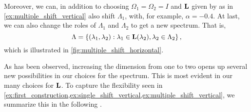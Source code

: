 \documentclass[../thesis.tex]{subfiles}
\begin{document}
\begin{remark}\label{rem:switch_lambda}
    Moreover, we can, in addition to choosing $\Omega_1=\Omega_2 = I$ and $\mathbf{L}$ given by  as in \cref{ex:multiple_shift_vertical} also shift $\Lambda_1$, with, for example, $\alpha = -0.4$. %
    At last, we can also change the roles of $\Lambda_1$ and $\Lambda_2$ to get a new spectrum. That is,
    \begin{equation*}
        \Lambda = \left\{\left(\lambda_1, \lambda_2\right): \lambda_1 \in \mathbf{L}(\lambda_2), \lambda_2 \in \Lambda_2 \right\},
    \end{equation*}
    which is illustrated in \cref{fig:multiple_shift_horizontal}.
\end{remark}

As has been observed, increasing the dimension from one to two opens up several new possibilities in our choices for the spectrum. This is most evident in our many choices for $\mathbf{L}$. To capture the flexibility seen in \cref{ex:first_construction,ex:single_shift_vertical,ex:multiple_shift_vertical}, we summarize this in the following . 



\end{document}
